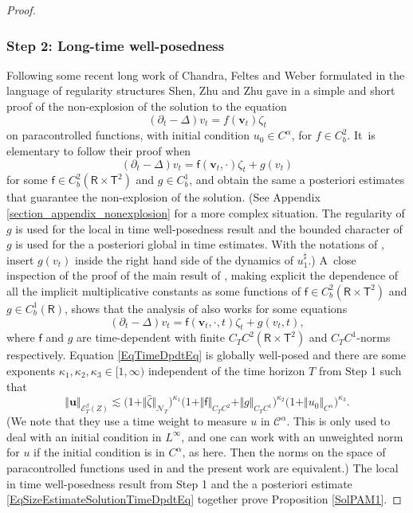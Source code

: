 \documentclass[10pt]{amsart}
\theoremstyle{definition}
\newcommand\bbR{\mathbf{\mathsf{R}}}
\newcommand{\mcE}{\mathcal{E}}
\newcommand{\mcN}{\mathcal{N}}
\newcommand{\bsu}{\boldsymbol{u}}
\newcommand{\bsv}{\boldsymbol{v}}
\newcommand{\scrC}{\ensuremath{\mathscr{C}}}
\begin{document}
\begin{proof}
\subsubsection*{Step 2: Long-time well-posedness} Following some recent long work of Chandra, Feltes and Weber \cite{CFW} formulated in the language of regularity structures Shen, Zhu and Zhu gave in \cite{ShenZhuZhu} a simple and short proof of the non-explosion of the solution to the equation
\[
(\partial_t - \Delta)v_t = f(\bsv_t) \zeta_t
\]
on paracontrolled functions, with initial condition $u_0\in C^\alpha$, for $f\in C^2_b$. It~is elementary to follow their proof when
\[
(\partial_t - \Delta)v_t = \mathsf{f}(\bsv_t,\cdot) \zeta_t + g(v_t)
\]
for some $\mathsf{f}\in C^2_b(\bbR\times\mathsf{T}^2)$ and $g\in C^1_b$, and obtain the same a posteriori estimates that guarantee the non-explosion of the solution. (See Appendix \ref{section_appendix_nonexplosion} for a more complex situation. The regularity of $g$ is used for the local in time well-posedness result and the bounded character of $g$ is used for the a posteriori global in time estimates. With the notations of \cite{ShenZhuZhu}, insert $g(v_t)$ inside the right hand side of the dynamics of $u_1^\sharp$.) A~close inspection of the proof of the main result of \cite{ShenZhuZhu}, making explicit the dependence of all the implicit multiplicative constants as some functions of $\mathsf{f}\in C^2_b(\bbR\times\mathsf{T}^2)$ and $g\in C^1_b(\bbR)$, shows that the analysis of \cite{ShenZhuZhu} also works for some equations
\begin{equation} \label{EqTimeDpdtEq}
(\partial_t - \Delta)v_t = \mathsf{f}(\bsv_t, \cdot, t) \zeta_t + g(v_t,t),
\end{equation}
where $\mathsf{f}$ and $g$ are time-dependent with finite $C_TC^2(\bbR\times\mathsf{T}^2)$ and $C_TC^1$-norms respectively. Equation \eqref{EqTimeDpdtEq} is globally well-posed and there are some exponents $\kappa_1,\kappa_2, \kappa_3\in [1,\infty)$ independent of the time horizon $T$ from Step 1 such that
\begin{equation} \label{EqSizeEstimateSolutionTimeDpdtEq}
\Vert \bsu\Vert_{\mcE_T^\beta(Z)} \lesssim \bigl(1 + \Vert\widehat\zeta\Vert_{{\boldsymbol{\mcN}}_T}\bigr)^{\kappa_1} \bigl( 1 + \Vert \mathsf{f}\Vert_{C_TC^2} + \Vert g\Vert_{C_TC^1}\bigr)^{\kappa_2} \bigl(1+\Vert u_0\Vert_{C^\alpha}\bigr)^{\kappa_3}.
\end{equation}
(We note that they use a time weight to measure $u$ in $\scrC^\alpha$. This is only used to deal with an initial condition in $L^\infty$, and one can work with an unweighted norm for $u$ if the initial condition is in $C^\alpha$, as here. Then the norms on the space of paracontrolled functions used in \cite{ShenZhuZhu} and the present work are equivalent.) The local in time well-posedness result from Step 1 and the a posteriori estimate \eqref{EqSizeEstimateSolutionTimeDpdtEq} together prove Proposition \ref{SolPAM1}.
\end{proof}
\end{document}
